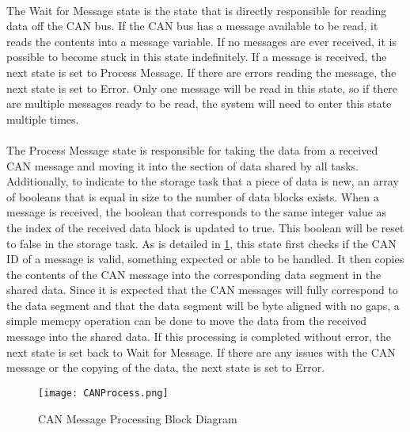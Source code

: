 \paragraph{}
The Wait for Message state is the state that is directly responsible for reading data off the CAN bus.
If the CAN bus has a message available to be read, it reads the contents into a message variable.
If no messages are ever received, it is possible to become stuck in this state indefinitely.
If a message is received, the next state is set to Process Message.
If there are errors reading the message, the next state is set to Error.
Only one message will be read in this state, so if there are multiple messages ready to be read, the system will need to enter this state multiple times.

\paragraph{}
The Process Message state is responsible for taking the data from a received CAN message and moving it into the section of data shared by all tasks.
Additionally, to indicate to the storage task that a piece of data is new, an array of booleans that is equal in size to the number of data blocks exists.
When a message is received, the boolean that corresponds to the same integer value as the index of the received data block is updated to true.
This boolean will be reset to false in the storage task.
As is detailed in \cref{fig:CANProcess}, this state first checks if the CAN ID of a message is valid, something expected or able to be handled.
It then copies the contents of the CAN message into the corresponding data segment in the shared data.
Since it is expected that the CAN messages will fully correspond to the data segment and that the data segment will be byte aligned with no gaps, a simple memcpy operation can be done to move the data from the received message into the shared data.
If this processing is completed without error, the next state is set back to Wait for Message.
If there are any issues with the CAN message or the copying of the data, the next state is set to Error.

\begin{figure}[H]
	\centering
	\texttt{[image: CANProcess.png]}
	\caption{CAN Message Processing Block Diagram}
	\label{fig:CANProcess}
\end{figure}

